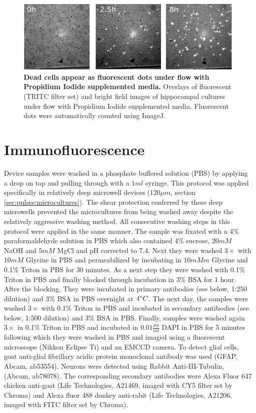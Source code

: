  \begin{figure}[h]
     \centering
     \includegraphics[width=15cm]{chapter2/figures/PIAssayIllustration/PIAssay.jpg}
     \caption[Example fluorescence images of Propidium Iodide staining under flow]{\textbf{Dead cells appear as fluorescent dots under flow with Propidium Iodide supplemented media.} Overlays of fluorescent (TRITC filter set) and bright field images of hippocampal cultures under flow with Propidium Iodide supplemented media. Fluorescent dots were automatically counted using ImageJ.}
     \label{fig:methods:PIAssay}

 \end{figure}

 \section{Immunofluorescence}
Device samples were washed in a phosphate buffered solution (PBS) by applying a drop on top and pulling through with a \(1ml\) syringe. This protocol was applied specifically in relatively deep microwell devices (\(120\mu m\), section \ref{sec:pulses:microcultures}). The shear protection conferred by these deep microwells prevented the microcultures from being washed away despite the relatively aggressive washing method. All consecutive washing steps in this protocol were applied in the same manner. The sample was fixated with a 4\% paraformaldehyde solution in PBS which also contained 4\% sucrose, \(20mM\) NaOH and \(5mM\) MgCl and pH corrected to 7.4. Next they were washed \(3\times\) with \(10mM\) Glycine in PBS and permeabilized by incubating in \(10mMm\) Glycine and 0.1\% Triton in PBS for 30 minutes.  As a next step they were washed with 0.1\% Triton in PBS and finally blocked through incubation in 3\% BSA for 1 hour. After the blocking, They were  incubated in primary antibodies (see below, 1:250 dilution) and 3\% BSA in PBS overnight at \(4\degree C\). The next day, the samples were washed \(3\times\) with 0.1\% Triton in PBS and incubated in secondary antibodies (see below, 1:500 dilution) and 3\% BSA in PBS. Finally, samples were washed again \(3\times\) in 0.1\% Triton in PBS and incubated in \(0.01 \frac{\mu g}{ml}\) DAPI in PBS for 5 minutes following which they were washed in PBS and imaged using a fluorescent microscope (Nikkon Eclipse Ti) and an EMCCD camera. To detect glial cells, goat anti-glial fibrillary acidic protein monoclonal antibody was used (GFAP, Abcam, ab53554). Neurons were detected using Rabbit Anti-\textbeta III-Tubulin, (Abcam, ab78078). The corresponding secondary antibodies were Alexa Fluor 647 chicken anti-goat (Life Technologies, A21469, imaged with CY5 filter set by Chroma) and Alexa fluor 488 donkey anti-rabit (Life Technologies, A21206, imaged with FITC filter set by Chroma).



